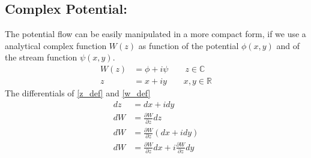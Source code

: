 \subsection*{Complex Potential:}
The potential flow can be easily manipulated in a more compact form, if we use a analytical complex function $W(z)$ as function of the potential $\phi(x,y)$ and of the stream function $\psi(x,y)$.
\begin{align}
    W(z) &= \phi  + i \psi \label{w_def} \qquad z \in  \mathbb{C} \\
    z &=  x + iy \label{z_def}  \qquad x,y \in \mathbb{R}
\end{align}
The differentials of \eqref{z_def} and \eqref{w_def}
\begin{align}
    dz &= dx + idy  \\
    dW &= \frac{\partial W}{\partial z}dz \\
    dW &= \frac{\partial W}{\partial z}(dx + idy) \\
    dW &= \frac{\partial W}{\partial z}dx + i\frac{\partial W}{\partial z}dy \\
\end{align}

